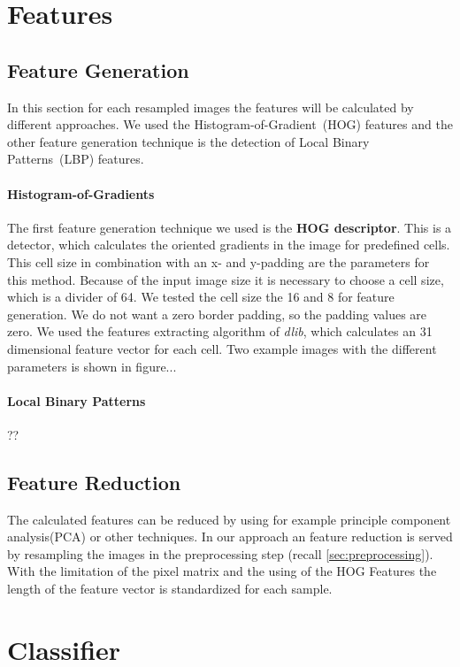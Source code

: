 \documentclass[a4paper,10pt]{article}
\begin{document}
\section{Features}
\subsection{Feature Generation}

In this section for each resampled images the features will be calculated by different approaches.
We used the Histogram-of-Gradient~(HOG) features and the other feature generation technique is the detection of Local Binary Patterns~(LBP) features.
\paragraph{Histogram-of-Gradients}

The first feature generation technique we used is the \textbf{HOG descriptor}.
This is a detector, which calculates the oriented gradients in the image for predefined cells. 
This cell size in combination with an x- and y-padding are the parameters for this method.
Because of the input image size it is necessary to choose a cell size, which is a divider of 64. 
We tested the cell size the 16 and 8 for feature generation. We do not want a zero border padding, so the padding values are zero. 
We used the features extracting algorithm of \emph{dlib}, which calculates an 31 dimensional feature vector for each cell.
Two example images with the different parameters is shown in figure...
\paragraph{Local Binary Patterns}
??

\subsection{Feature Reduction}

The calculated features can be reduced by using for example principle component analysis(PCA) or other techniques.
In our approach an feature reduction is served by resampling the images in the preprocessing step (recall \autoref{sec:preprocessing}).
With the limitation of the pixel matrix and the using of the HOG Features the length of the feature vector is standardized for each sample.

\section{Classifier}
\end{document}
